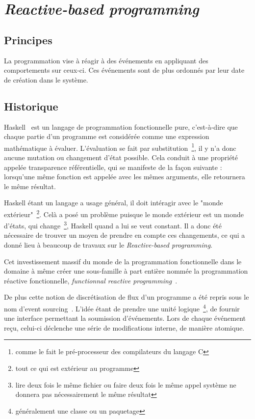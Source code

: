 \documentclass{article}
\begin{document}
\section{\emph{Reactive-based programming}}\label{reactive}

\subsection{Principes}\label{principes-1}

La programmation vise à réagir à des événements en appliquant des
comportements sur ceux-ci. Ces événements sont de plus ordonnés par
leur date de création dans le système.

\subsection{Historique}\label{historique-1}

Haskell~\cite{haskell} est un langage de programmation fonctionnelle pure, c'est-à-dire
que chaque partie d'un programme est considérée comme une expression mathématique
à évaluer. L'évaluation se fait par substitution~\footnote{comme le fait le pré-processeur
des compilateurs du langage C}, il y n'a donc aucune mutation ou changement d'état
possible. Cela conduit à une propriété appelée transparence référentielle, qui se
manifeste de la façon suivante : lorsqu'une même fonction est appelée avec les mêmes
arguments, elle retournera le même résultat.

Haskell étant un langage a usage général, il doit intéragir avec le "monde extérieur"~\footnote{tout ce qui est extérieur au programme}.
Celà a posé un problème puisque le monde extérieur est un monde d'états, qui change~\footnote{lire deux fois le même fichier ou faire deux fois le même appel système ne donnera pas nécessairement le même résultat},
Haskell quand a lui se veut constant.
Il a donc été nécessaire de trouver un moyen de prendre en compte ces changements,
ce qui a donné lieu à beaucoup de travaux sur le \emph{Reactive-based programming}.

Cet investissement massif du monde de la programmation fonctionnelle
dans le domaine à même créer une sous-famille à part entière nommée la
programmation réactive fonctionnelle, \emph{functionnal reactive programming}~\cite{frp}.

De plus cette notion de discrétisation de flux d'un programme a été repris
sous le nom d'event sourcing~\cite{eventsourcing}. 
L'idée étant de prendre une unité logique~\footnote{généralement une classe ou un paquetage},
de fournir une interface permettant la soumission d'événements. Lors de chaque événement
reçu, celui-ci déclenche une série de modifications interne, de manière atomique.
\end{document}
